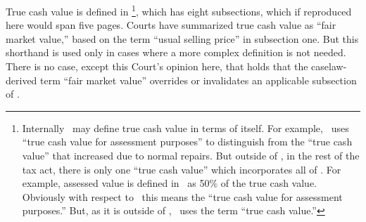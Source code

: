 \documentclass[12pt,\documentclassflag]{michiganCourtOfAppealsBrief}
\begin{document}
True cash value is defined in \cite{MCL 211.27}%
\footnote{Internally \cite[s]{MCL 211.27}\ may define true cash value in terms of itself. For example, \mathieuGast\ uses ``true cash value for assessment purposes'' to distinguish from the ``true cash value'' that increased due to normal repairs. But outside of \cite[s]{MCL 211.27}, in the rest of the tax act, there is only one ``true cash value'' which incorporates all of \cite[s]{MCL 211.27}.
  For example, assessed value is defined in \cite{MCL 211.27a(1)}\ as 50\% of the true cash value. Obviously with respect to \mathieuGast\ this means the ``true cash value for assessment purposes.'' But, as it is outside of \cite[s]{MCL 211.27}, \cite{MCL 211.27a(1)}\ uses the term ``true cash value.''}, 
which has eight subsections, which if reproduced here would span five pages. Courts have summarized true cash value as ``fair market value,'' based on the term ``usual selling price'' in subsection one. But this shorthand is used only in cases where a more complex definition is not needed. There is no case, except this Court's opinion here, that holds that the caselaw-derived term ``fair market value'' overrides or invalidates an applicable subsection of \cite[s]{MCL 211.27}.
\end{document}
